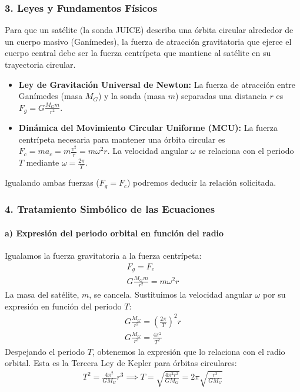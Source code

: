 \subsubsection*{3. Leyes y Fundamentos Físicos}
Para que un satélite (la sonda JUICE) describa una órbita circular alrededor de un cuerpo masivo (Ganímedes), la fuerza de atracción gravitatoria que ejerce el cuerpo central debe ser la fuerza centrípeta que mantiene al satélite en su trayectoria circular.
\begin{itemize}
    \item \textbf{Ley de Gravitación Universal de Newton:} La fuerza de atracción entre Ganímedes (masa $M_G$) y la sonda (masa $m$) separadas una distancia $r$ es $F_g = G \frac{M_G m}{r^2}$.
    \item \textbf{Dinámica del Movimiento Circular Uniforme (MCU):} La fuerza centrípeta necesaria para mantener una órbita circular es $F_c = m a_c = m \frac{v^2}{r} = m \omega^2 r$. La velocidad angular $\omega$ se relaciona con el periodo $T$ mediante $\omega = \frac{2\pi}{T}$.
\end{itemize}
Igualando ambas fuerzas ($F_g = F_c$) podremos deducir la relación solicitada.

\subsubsection*{4. Tratamiento Simbólico de las Ecuaciones}
\paragraph*{a) Expresión del periodo orbital en función del radio}
Igualamos la fuerza gravitatoria a la fuerza centrípeta:
\begin{gather}
    F_g = F_c \nonumber \\[8pt]
    G \frac{M_G m}{r^2} = m \omega^2 r
\end{gather}
La masa del satélite, $m$, se cancela. Sustituimos la velocidad angular $\omega$ por su expresión en función del periodo $T$:
\begin{gather}
    G \frac{M_G}{r^2} = \left(\frac{2\pi}{T}\right)^2 r \nonumber \\[8pt]
    G \frac{M_G}{r^3} = \frac{4\pi^2}{T^2}
\end{gather}
Despejando el periodo $T$, obtenemos la expresión que lo relaciona con el radio orbital. Esta es la Tercera Ley de Kepler para órbitas circulares:
\begin{gather}
    T^2 = \frac{4\pi^2}{G M_G} r^3 \implies T = \sqrt{\frac{4\pi^2 r^3}{G M_G}} = 2\pi \sqrt{\frac{r^3}{G M_G}}
\end{gather}

